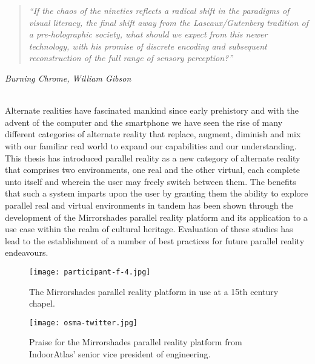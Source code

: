 \begin{quote}
	\textit{``If the chaos of the nineties reflects a radical shift in the paradigms of visual literacy, the final shift away from the Lascaux/Gutenberg tradition of a pre-holographic society, what should we expect from this newer technology, with his promise of discrete encoding and subsequent reconstruction of the full range of sensory perception?''}
\end{quote}
\hfill \textit{Burning Chrome, William Gibson}
\\
\\


\label{chapter-conclusions}

Alternate realities have fascinated mankind since early prehistory and with the advent of the computer and the smartphone we have seen the rise of many different categories of alternate reality that replace, augment, diminish and mix with our familiar real world to expand our capabilities and our understanding. This thesis has introduced parallel reality as a new category of alternate reality that comprises two environments, one real and the other virtual, each complete unto itself and wherein the user may freely switch between them. The benefits that such a system imparts upon the user by granting them the ability to explore parallel real and virtual environments in tandem has been shown through the development of the Mirrorshades parallel reality platform and its application to a use case within the realm of cultural heritage. Evaluation of these studies has lead to the establishment of a number of best practices for future parallel reality endeavours.

\begin{figure}[t]
	\begin{center}
		\texttt{[image: participant-f-4.jpg]}
		\caption{The Mirrorshades parallel reality platform in use at a 15th century chapel.}
		\label{participant-f-4.jpg}
	\end{center}	
\end{figure}

\begin{figure}[t]
	\begin{center}
		\texttt{[image: osma-twitter.jpg]}
		\caption{Praise for the Mirrorshades parallel reality platform from IndoorAtlas' senior vice president of engineering.}
		\label{osma-twitter.jpg}
	\end{center}	
\end{figure}


